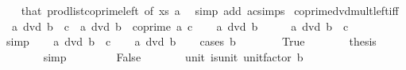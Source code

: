 \begin{isabellebody}
%
\isadelimproof
\ \ %
\endisadelimproof
%
\isatagproof
{}\isamarkupfalse%
\ that\ prod{\isacharunderscore}{\kern0pt}list{\isacharunderscore}{\kern0pt}coprime{\isacharunderscore}{\kern0pt}left\ {\isacharbrackleft}{\kern0pt}of\ xs\ a{\isacharbrackright}{\kern0pt}\ \isamarkupfalse%
\ {\isacharparenleft}{\kern0pt}simp\ add{\isacharcolon}{\kern0pt}\ ac{\isacharunderscore}{\kern0pt}simps{\isacharparenright}{\kern0pt}%
\endisatagproof
{\isafoldproof}%
%
\isadelimproof
\isanewline
%
\endisadelimproof
\isanewline
{}\isamarkupfalse%
\ coprime{\isacharunderscore}{\kern0pt}dvd{\isacharunderscore}{\kern0pt}mult{\isacharunderscore}{\kern0pt}left{\isacharunderscore}{\kern0pt}iff{\isacharcolon}{\kern0pt}\isanewline
\ \ {\isachardoublequoteopen}a\ dvd\ b\ {\isacharasterisk}{\kern0pt}\ c\ {\isasymlongleftrightarrow}\ a\ dvd\ b{\isachardoublequoteclose}\ \ {\isachardoublequoteopen}coprime\ a\ c{\isachardoublequoteclose}\isanewline
%
\isadelimproof
%
\endisadelimproof
%
\isatagproof
{}\isamarkupfalse%
\isanewline
\ \ \isamarkupfalse%
\ {\isachardoublequoteopen}a\ dvd\ b{\isachardoublequoteclose}\isanewline
\ \ \isamarkupfalse%
\ \isamarkupfalse%
\ {\isachardoublequoteopen}a\ dvd\ b\ {\isacharasterisk}{\kern0pt}\ c{\isachardoublequoteclose}\isanewline
\ \ \ \ \isamarkupfalse%
\ simp\isanewline
{}\isamarkupfalse%
\isanewline
\ \ \isamarkupfalse%
\ {\isachardoublequoteopen}a\ dvd\ b\ {\isacharasterisk}{\kern0pt}\ c{\isachardoublequoteclose}\isanewline
\ \ \isamarkupfalse%
\ {\isachardoublequoteopen}a\ dvd\ b{\isachardoublequoteclose}\isanewline
\ \ \isamarkupfalse%
\ {\isacharparenleft}{\kern0pt}cases\ {\isachardoublequoteopen}b\ {\isacharequal}{\kern0pt}\ {}{\isachardoublequoteclose}{\isacharparenright}{\kern0pt}\isanewline
\ \ \ \ \isamarkupfalse%
\ True\isanewline
\ \ \ \ \isamarkupfalse%
\ \isamarkupfalse%
\ {\isacharquery}{\kern0pt}thesis\isanewline
\ \ \ \ \ \ \isamarkupfalse%
\ simp\isanewline
\ \ \isamarkupfalse%
\isanewline
\ \ \ \ \isamarkupfalse%
\ False\isanewline
\ \ \ \ \isamarkupfalse%
\ \isamarkupfalse%
\ unit{\isacharcolon}{\kern0pt}\ {\isachardoublequoteopen}is{\isacharunderscore}{\kern0pt}unit\ {\isacharparenleft}{\kern0pt}unit{\isacharunderscore}{\kern0pt}factor\ b{\isacharparenright}{\kern0pt}{\isachardoublequoteclose}\isanewline

\end{isabellebody}
